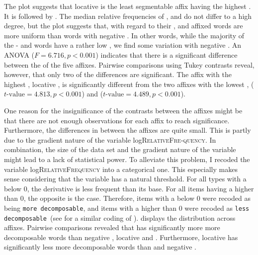 The plot suggests that locative  is the least segmentable affix having the highest . It is followed by . The median relative {frequencies} of ,  and  do not differ to a high degree, but the plot suggests that, with regard to their ,  and affixed words are more uniform than words with negative . In other words, while the majority of the - and words have a rather low , we find some variation with negative . 
 An ANOVA ($F=6.716 ,p<0.001$) indicates that there is a significant difference between the  of the five affixes. Pairwise comparisons using Tukey contrasts reveal, however, that only two of the differences are significant. The affix with the highest , locative , is significantly different from the two affixes with the lowest ,  ($t$-$\text{value}=4.813, p<0.001$)  and  ($t$-$\text{value}=4.489, p<0.001$). 

            

One reason for the insignificance of the contrasts between the affixes might be that there are not enough observations for each affix to reach significance. Furthermore, the differences in  between the affixes are quite small. This is partly due to the gradient nature of the variable log\textsc{RelativeFre-quency}. In combination, the size of the data set and the gradient nature of the variable might lead to a lack of statistical power. 
To alleviate this problem, I recoded the variable log\textsc{RelativeFrequency} into a categorical one. This especially makes sense considering that the variable has a natural threshold. For all types with a  below 0, the derivative is less frequent than its base. For all items having a  higher than 0, the opposite is the case. Therefore, items with a  below 0 were recoded as being \texttt{more decomposable}, and items with a  higher than 0 were recoded as \texttt{less decomposable }(see \citealt{Hay.2001,Collie.2008} for a similar coding of ).  displays the distribution across affixes.
Pairwise comparisons revealed that  has significantly more {more decomposable} words  than negative , locative  and . Furthermore, locative  has significantly less {more decomposable} words than  and negative . 

